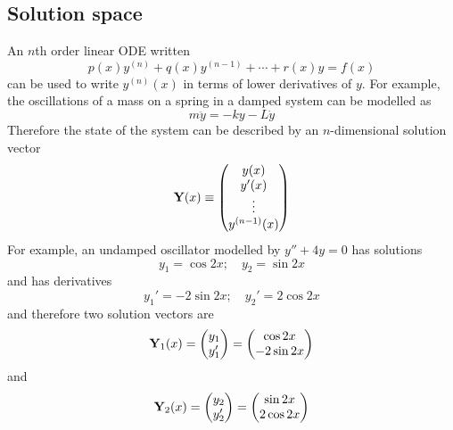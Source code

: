 \subsection{Solution space}
An \(n\)th order linear ODE written
\[
	p(x)y^{(n)} + q(x) y^{(n-1)} + \cdots + r(x)y = f(x)
\]
can be used to write \(y^{(n)}(x)\) in terms of lower derivatives of \(y\).
For example, the oscillations of a mass on a spring in a damped system can be modelled as
\[
	m\ddot y = -k y - L\dot y
\]
Therefore the state of the system can be described by an \(n\)-dimensional solution vector
\begin{equation}
	\vb Y(x) \equiv \begin{pmatrix}
		y(x) \\ y'(x) \\ \vdots \\ y^{(n-1)}(x)
	\end{pmatrix}
\end{equation}
For example, an undamped oscillator modelled by \(y'' + 4y = 0\) has solutions
\[
	y_1 = \cos 2x;\quad y_2 = \sin 2x
\]
and has derivatives
\[
	y_1' = -2\sin 2x;\quad y_2' = 2\cos 2x
\]
and therefore two solution vectors are
\[
	\vb Y_1(x) = \begin{pmatrix}
		y_1 \\ y_1'
	\end{pmatrix} = \begin{pmatrix}
		\cos 2x \\ -2 \sin 2x
	\end{pmatrix}
\]
and
\[
	\vb Y_2(x) = \begin{pmatrix}
		y_2 \\ y_2'
	\end{pmatrix} = \begin{pmatrix}
		\sin 2x \\ 2 \cos 2x
	\end{pmatrix}
\]

\begin{wrapfigure}{l}{0.3\textwidth}
\end{wrapfigure}

